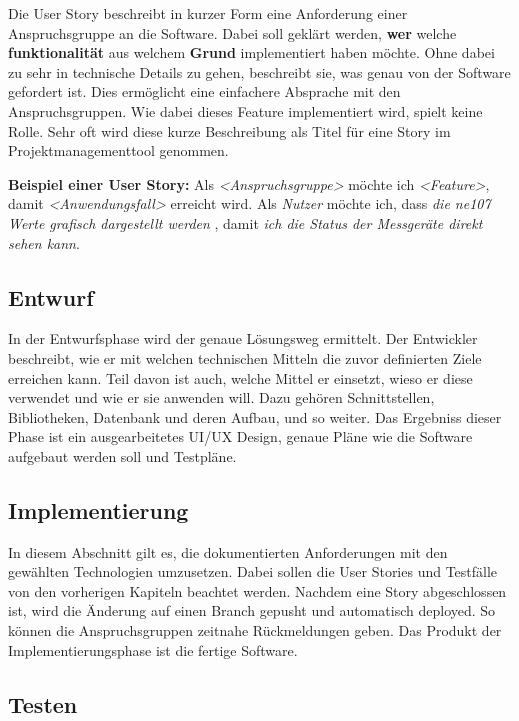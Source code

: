 Die User Story beschreibt in kurzer Form eine Anforderung einer Anspruchsgruppe an die Software. Dabei soll geklärt werden, \textbf{wer} welche \textbf{funktionalität} aus welchem \textbf{Grund} implementiert haben möchte. Ohne dabei zu sehr in technische Details zu gehen, beschreibt sie, was genau von der Software gefordert ist. Dies ermöglicht eine einfachere Absprache mit den Anspruchsgruppen. Wie dabei dieses Feature implementiert wird, spielt keine Rolle. Sehr oft wird diese kurze Beschreibung als Titel für eine Story im Projektmanagementtool genommen.

\textbf{Beispiel einer User Story:}
\newline
Als \textit{<Anspruchsgruppe>} möchte ich \textit{<Feature>}, damit \textit{<Anwendungsfall>} erreicht wird.
\linebreak
\linebreak
Als \textit{Nutzer} möchte ich, dass \textit{die ne107 Werte grafisch dargestellt werden} , damit \textit{ich die Status der Messgeräte direkt sehen kann}.

\subsection{Entwurf}

In der Entwurfsphase wird der genaue Lösungsweg ermittelt. Der Entwickler beschreibt, wie er mit welchen technischen Mitteln die zuvor definierten Ziele erreichen kann. Teil davon ist auch, welche Mittel er einsetzt, wieso er diese verwendet und wie er sie anwenden will. Dazu gehören Schnittstellen, Bibliotheken, Datenbank und deren Aufbau, und so weiter. Das Ergebniss dieser Phase ist ein ausgearbeitetes UI/UX Design, genaue Pläne wie die Software aufgebaut werden soll und Testpläne.

\subsection{Implementierung}

In diesem Abschnitt gilt es, die dokumentierten Anforderungen mit den gewählten Technologien umzusetzen. Dabei sollen die User Stories und Testfälle von den vorherigen Kapiteln beachtet werden. \newline
Nachdem eine Story abgeschlossen ist, wird die Änderung auf einen Branch gepusht und automatisch deployed. So können die Anspruchsgruppen zeitnahe Rückmeldungen geben. Das Produkt der Implementierungsphase ist die fertige Software.


\subsection{Testen}

